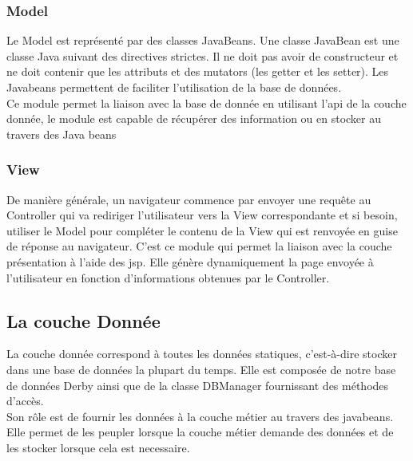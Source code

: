 \subsubsection{Model}
Le Model est représenté par des classes JavaBeans. Une classe JavaBean est une 
classe Java suivant des directives strictes. Il ne doit pas avoir de 
constructeur et ne doit contenir que les attributs et des mutators (les getter et les setter).
Les Javabeans permettent de faciliter l'utilisation de la base de données. \\
Ce module permet la liaison avec la base de donnée en utilisant l'api de la couche donnée, le module est capable de récupérer des information ou en stocker au travers des Java beans

\subsubsection{View}
De manière générale, un navigateur commence par envoyer une requête au 
Controller qui va rediriger l'utilisateur vers la View correspondante et si 
besoin, utiliser le Model pour compléter le contenu de la View qui est renvoyée en guise de réponse au navigateur.
C'est ce module qui permet la liaison avec la couche présentation à l'aide des jsp.
Elle génère dynamiquement la page envoyée à l'utilisateur en fonction d'informations obtenues par le Controller.

\subsection{La couche Donnée}
La couche donnée correspond à toutes les données statiques, c'est-à-dire stocker dans une base de données la plupart du temps.
Elle est composée de notre base de données Derby ainsi que de la classe DBManager fournissant des méthodes d'accès. \\

Son rôle est de fournir les données à la couche métier au travers des javabeans.
Elle permet de les peupler lorsque la couche métier demande des données et de les stocker lorsque cela est necessaire.
